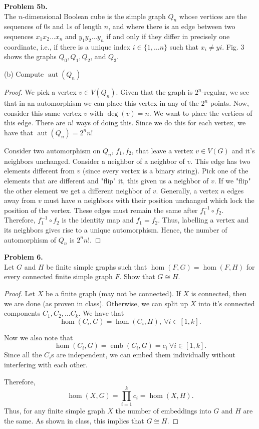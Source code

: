 \documentclass{article}
\newcommand{\set}[1]{\{#1\}}
\DeclareMathOperator*{\aut}{aut}
\DeclareMathOperator*{\emb}{emb}
\newenvironment{hwproof}[2]
{
    \textbf{Problem #1.}\\
    #2
    \begin{proof}
}{
    \end{proof}
    \newpage
}
\begin{document}
\begin{hwproof}
    {5b}
    {
        The $n$-dimensional Boolean cube is the simple graph $Q_n$ whose vertices are the
        sequences of 0s and 1s of length $n$, and where there is an edge between two sequences
        $x_1x_2\dots x_n$ and $y_1y_2\dots y_n$ if and only if they differ in precisely
        one coordinate, i.e., if there is a unique index $i \in \set{1,\dots n}$ such that
        $x_i \neq yi$. Fig. 3 shows the graphs $Q_0, Q_1, Q_2$, and $Q_3$.

        (b) Compute $\aut(Q_n)$
    }
    We pick a vertex $v \in V(Q_n)$. Given that the graph is $2^n$-regular, we see that
    in an automorphism we can place this vertex in any of the $2^n$ points.
    Now, consider this same vertex $v$ with $\deg(v) = n$. We want to place the vertices
    of this edge. There are $n!$ ways of doing this. Since
    we do this for each vertex, we have that $\aut(Q_n) = 2^nn!$

    Consider two automorphism on $Q_n$, $f_1, f_2$, that leave a vertex $v \in V(G)$
    and it's neighbors unchanged. Consider a neighbor of a neighbor of $v$. This
    edge has two elements different from $v$ (since every vertex is a binary string).
    Pick one of the elements that are different and "flip" it, this given us
    a neighbor of $v$. If we "flip" the other element we get a different
    neighbor of $v$. Generally, a vertex $n$ edges away from $v$ must have
    $n$ neighbors with their position unchanged which lock the position of
    the vertex. These edges must remain the same after $f_1^{-1}\circ f_2$.
    Therefore, $f_1^{-1}\circ f_2$ is the identity map and $f_1 = f_2$.
    Thus, labelling a vertex and its neighbors gives rise to a unique
    automorphism. Hence, the number of automorphism of $Q_n$ is $2^nn!$.
\end{hwproof}

\begin{hwproof}
    {6}
    {
        Let $G$ and $H$ be finite simple graphs such that $\hom(F, G) = \hom(F,H)$ for every
        connected finite simple graph $F$. Show that $G \cong H$.
    }
    Let $X$ be a finite graph (may not be
    connected). If $X$ is connected, then we are done (as proven in class).
    Otherwise, we can split up $X$ into it's connected components
    $C_1, C_2, \dots C_k$. We have that
    \[\hom(C_i, G) = \hom(C_i, H), \ \forall i \in [1,k].\]

    Now we also note that
    \[\hom(C_i, G) = \emb(C_i, G) = c_i \ \forall i \in [1,k].\]
    Since all the $C_i$s are independent, we can embed them individually without
    interfering with each other.

    Therefore,
    \[\hom(X, G) = \prod_{i = 1}^k c_i = \hom(X, H).\]
    Thus, for any finite simple graph $X$ the number of embeddings into $G$ and
    $H$ are the same. As shown in class, this implies that $G \cong H$.
\end{hwproof}
\end{document}
